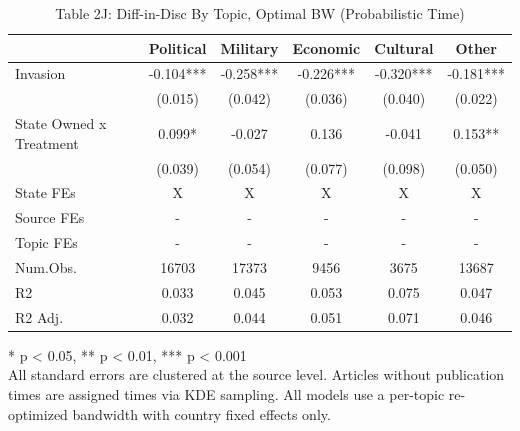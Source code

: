 \begin{table}[!t]
\caption{Table 2J: Diff-in-Disc By Topic, Optimal BW (Probabilistic Time)} 
\fontsize{12.0pt}{14.4pt}\selectfont
\begin{tabular*}{\linewidth}{@{\extracolsep{\fill}}lccccc}
\toprule
  & Political & Military & Economic & Cultural & Other \\ 
\midrule\addlinespace[2.5pt]
Invasion & -0.104*** & -0.258*** & -0.226*** & -0.320*** & -0.181*** \\ 
 & (0.015) & (0.042) & (0.036) & (0.040) & (0.022) \\ 
State Owned x Treatment & 0.099* & -0.027 & 0.136 & -0.041 & 0.153** \\ 
{} & {(0.039)} & {(0.054)} & {(0.077)} & {(0.098)} & {(0.050)} \\ 
State FEs & X & X & X & X & X \\ 
Source FEs & - & - & - & - & - \\ 
Topic FEs & - & - & - & - & - \\ 
Num.Obs. & 16703 & 17373 & 9456 & 3675 & 13687 \\ 
R2 & 0.033 & 0.045 & 0.053 & 0.075 & 0.047 \\ 
R2 Adj. & 0.032 & 0.044 & 0.051 & 0.071 & 0.046 \\ 
\bottomrule
\end{tabular*}
\begin{minipage}{\linewidth}
* p < 0.05, ** p < 0.01, *** p < 0.001\\
All standard errors are clustered at the source level. Articles without
publication times are assigned times via KDE sampling. All models use a
per-topic re-optimized bandwidth with country fixed effects only.\\
\end{minipage}
\end{table}

